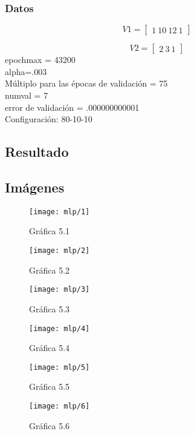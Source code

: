\documentclass[6pt]{article}
\begin{document}
\subsubsection{Datos}
\[V1=
\begin{bmatrix}
1\ 10\ 12\ 1
\end{bmatrix}\]

\[V2=
\begin{bmatrix}
2\ 3\ 1
\end{bmatrix}\]
epochmax = 43200\\
alpha=.003\\
Múltiplo para las épocas de validación = 75\\
numval = 7\\
error de validación = .000000000001\\
Configuración: 80-10-10
\subsection{Resultado}
\subsection{Imágenes}
\begin{figure}[htpb]
	\centering
	\texttt{[image: mlp/1]}
	\caption{Gráfica 5.1}
\end{figure}

\begin{figure}[htpb]
	\centering
	\texttt{[image: mlp/2]}
	\caption{Gráfica 5.2}
\end{figure}

\begin{figure}[htpb]
	\centering
	\texttt{[image: mlp/3]}
	\caption{Gráfica 5.3}
\end{figure}

\begin{figure}[htpb]
	\centering
	\texttt{[image: mlp/4]}
	\caption{Gráfica 5.4}
\end{figure}

\begin{figure}[htpb]
	\centering
	\texttt{[image: mlp/5]}
	\caption{Gráfica 5.5}
\end{figure}

\begin{figure}[htpb]
	\centering
	\texttt{[image: mlp/6]}
	\caption{Gráfica 5.6}
\end{figure}
\end{document}

